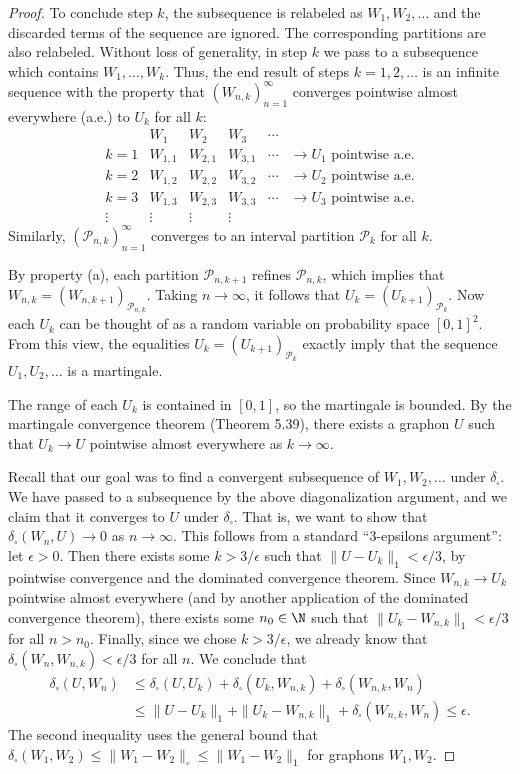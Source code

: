 \begin{proof}
To conclude step $k$, the subsequence is relabeled as $W_1,W_2,\ldots$ and the discarded terms of the sequence are ignored. The corresponding partitions are also relabeled. Without loss of generality, in step $k$ we pass to a subsequence which contains $W_1,\ldots,W_k$. Thus, the end result of steps $k=1,2,\ldots$ is an infinite sequence with the property that $(W_{n,k})_{n=1}^\infty$ converges pointwise almost everywhere (a.e.) to $U_k$ for all $k$:
\[
\begin{array}{c|ccccc}
& W_1&W_2&W_3&\cdots&\\\hline
k=1&W_{1,1}&W_{2,1}&W_{3,1}&\cdots&\to U_1\text{ pointwise a.e.}\\
k=2&W_{1,2}&W_{2,2}&W_{3,2}&\cdots&\to U_2\text{ pointwise a.e.}\\
k=3&W_{1,3}&W_{2,3}&W_{3,3}&\cdots&\to U_3\text{ pointwise a.e.}\\
\vdots&\vdots&\vdots&\vdots&&
\end{array}
\]
Similarly, $(\mathcal P_{n,k})_{n=1}^\infty$ converges to an interval partition $\mathcal P_k$ for all $k$.

By property (a), each partition $\mathcal P_{n,k+1}$ refines $\mathcal P_{n,k}$, which implies that $W_{n,k}=(W_{n,k+1})_{\mathcal P_{n,k}}$. Taking $n\to\infty$, it follows that $U_k=(U_{k+1})_{\mathcal P_k}$. Now each $U_k$ can be thought of as a random variable on probability space $[0,1]^2$. From this view, the equalities $U_k=(U_{k+1})_{\mathcal P_k}$ exactly imply that the sequence $U_1,U_2,\ldots$ is a martingale.

The range of each $U_k$ is contained in $[0,1]$, so the martingale is bounded. By the martingale convergence theorem (Theorem 5.39), there exists a graphon $U$ such that $U_k\to U$ pointwise almost everywhere as $k\to\infty$.

Recall that our goal was to find a convergent subsequence of $W_1,W_2,\ldots$ under $\delta_\square$. We have passed to a subsequence by the above diagonalization argument, and we claim that it converges to $U$ under $\delta_\square$. That is, we want to show that $\delta_\square(W_n,U)\to0$ as $n\to\infty$. This follows from a standard ``3-epsilons argument'': let $\epsilon>0$. Then there exists some $k>3/\epsilon$ such that $\|U-U_k\|_1<\epsilon/3$, by pointwise convergence and the dominated convergence theorem. Since $W_{n,k}\to U_k$ pointwise almost everywhere (and by another application of the dominated convergence theorem), there exists some $n_0\in\N$ such that $\|U_k-W_{n,k}\|_1<\epsilon/3$ for all $n>n_0$. Finally, since we chose $k>3/\epsilon$, we already know that $\delta_\square(W_n,W_{n,k})<\epsilon/3$ for all $n$. We conclude that
\begin{align*}
\delta_\square(U,W_n)&\leq\delta_\square(U,U_k)+\delta_\square(U_k,W_{n,k})+\delta_\square(W_{n,k},W_n)\\
&\leq\|U-U_k\|_1+\|U_k-W_{n,k}\|_1+\delta_\square(W_{n,k},W_n)\leq\epsilon.
\end{align*}
The second inequality uses the general bound that $\delta_\square(W_1,W_2)\leq\|W_1-W_2\|_\square\leq\|W_1-W_2\|_1$ for graphons $W_1,W_2$.
\end{proof}
